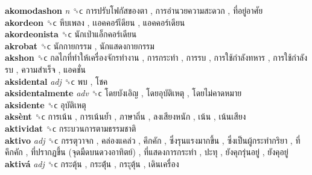 \textbf{akomodashon} \emph{n}  ␝ϲ   การปรับโฟกัสของตา ,  การอำนวยความสะดวก ,  ที่อยู่อาศัย   \\
\textbf{akordeon} ␝ϲ   หีบเพลง ,  เเอคคอร์เีดียน ,  แอคคอร์เดียน   \\
\textbf{akordeonista} ␝ϲ   นักเป่าแอ็กคอร์เดียน   \\
\textbf{akrobat} ␝ϲ   นักกายกรรม ,  นักแสดงกายกรรม   \\
\textbf{akshon} ␝ϲ   กลไกที่ทำให้เครื่องจักรทำงาน ,  การกระทำ ,  การรบ ,  การใช้กำลังทหาร ,  การใช้กำลังรบ ,  ความสำเร็จ ,  แอคชั่น   \\
\textbf{aksidental} \emph{adj}  ␝ϲ   พบ ,  โชค   \\
\textbf{aksidentalmente} \emph{adv}  ␝ϲ   โดยบังเอิญ ,  โดยอุบัติเหตุ ,  โดยไม่คาดหมาย   \\
\textbf{aksidente} ␝ϲ   อุบัติเหตุ   \\
\textbf{aksènt} ␝ϲ   การเน้น ,  การเน้นย้ำ ,  ภาษาถิ่น ,  ลงเสียงหนัก ,  เน้น ,  เน้นเสียง   \\
\textbf{aktividat} ␝ϲ   กระบวนการตามธรรมชาติ   \\
\textbf{aktivo} \emph{adj}  ␝ϲ   กรรตุวาจก ,  คล่องแคล่ว ,  คึกคัก ,  ซึ่งรุนแรงมากขึ้น ,  ซึ่งเป็นผู้กระทำกริยา ,  ที่คึกคัก ,  ที่ปรากฏขึ้น (จุดมืดบนดวงอาทิตย์) ,  ที่แสดงการกระทำ ,  ปะทุ ,  ยังคุกรุ่นอยู่ ,  ยังคุอยู่   \\
\textbf{aktivá} \emph{adj}  ␝ϲ   กระตุ้น ,  กระตุ้่น ,  กระุตุ้น ,  เดินเครื่อง   \\
